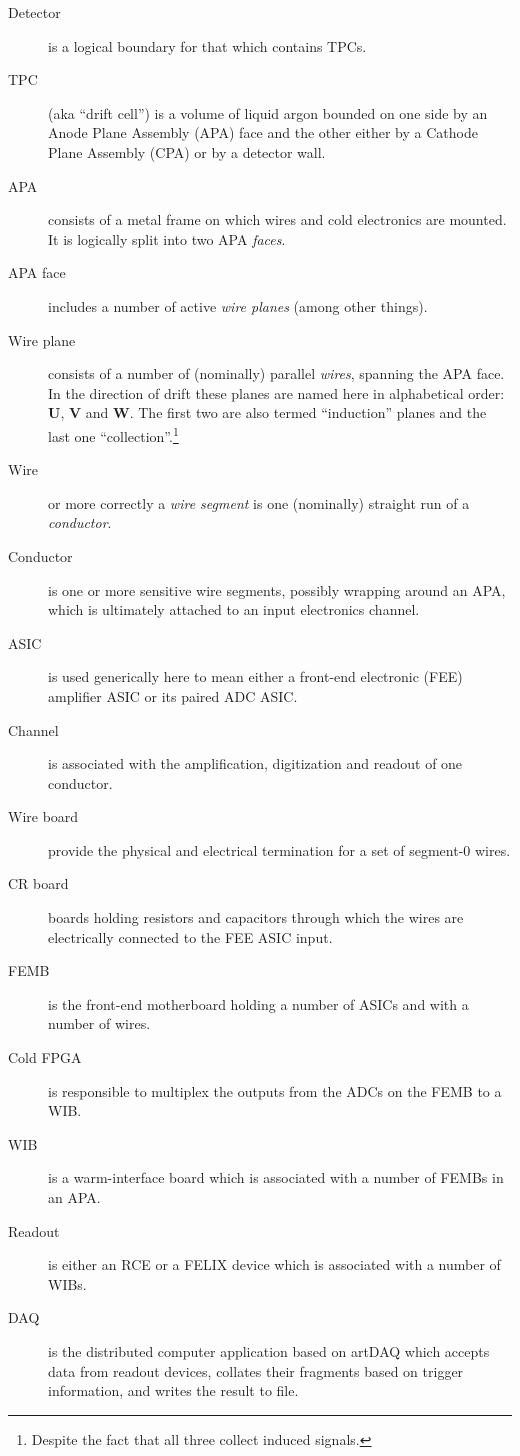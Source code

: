 \documentclass[pdftex,12pt,letter]{article}
\begin{document}
\begin{description}
\item[Detector] is a logical boundary for that which contains TPCs.
\item[TPC] (aka ``drift cell'') is a volume of liquid argon bounded on one side by an Anode
  Plane Assembly (APA) face and the other either by a Cathode Plane
  Assembly (CPA) or by a detector wall.
\item[APA] consists of a metal frame on which wires and cold
  electronics are mounted.  It is logically split into two APA \textit{faces}.
\item[APA face] includes a number of active \textit{wire
    planes} (among other things).
\item[Wire plane] consists of a number of (nominally) parallel
  \textit{wires}, spanning the APA face.  In the direction of drift
  these planes are named here in alphabetical order: \textbf{U},
  \textbf{V} and \textbf{W}.  The first two are also termed
  ``induction'' planes and the last one
  ``collection''.\footnote{Despite the fact that all three collect
    induced signals.}
\item[Wire] or more correctly a
  \textit{wire segment} is one (nominally) straight run of a \textit{conductor}.
\item[Conductor] is one or more sensitive wire segments, possibly
  wrapping around an APA, which is ultimately attached to an input
  electronics channel.
\item[ASIC] is used generically here to mean either a front-end
  electronic (FEE) amplifier ASIC or its paired ADC ASIC.
\item[Channel] is associated with the amplification, digitization and
  readout of one conductor.
\item[Wire board] provide the physical and electrical termination for
  a set of segment-0 wires.
\item[CR board] boards holding resistors and capacitors through which
  the wires are electrically connected to the FEE ASIC input.
\item[FEMB] is the front-end motherboard holding a number of ASICs and
  with a number of wires.
\item[Cold FPGA] is responsible to multiplex the outputs from the ADCs
  on the FEMB to a WIB.
\item[WIB] is a warm-interface board which is associated with a
  number of FEMBs in an APA.
\item[Readout] is either an RCE or a FELIX device which is associated
  with a number of WIBs.
\item[DAQ] is the distributed computer application based on artDAQ
  which accepts data from readout devices, collates their fragments
  based on trigger information, and writes the result to file.
\end{description}
\end{document}
